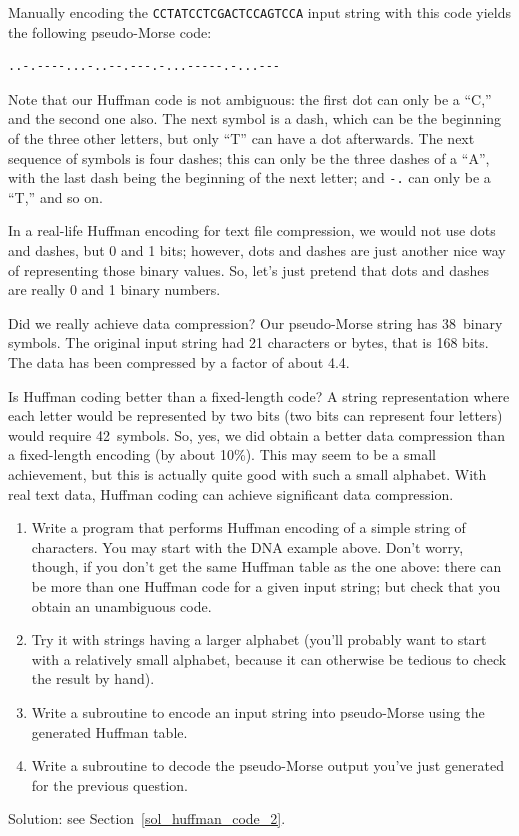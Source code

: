 Manually encoding the \verb'CCTATCCTCGACTCCAGTCCA' input string 
with this code yields the following pseudo-Morse code:

\begin{verbatim}
..-.----...-..--.---.-...-----.-...---
\end{verbatim}

Note that our Huffman code is not ambiguous: the first dot can 
only be a ``C,'' and the second one also. The next symbol is a 
dash, which can be the beginning of the three other letters, but 
only ``T'' can have a dot afterwards. The next sequence of 
symbols is four dashes; this can only be the three dashes of a 
``A'', with the last dash being the beginning of the next letter; 
and \verb'-.' can only be a ``T,'' and so on.

In a real-life Huffman encoding for text file compression, 
we would not use dots and dashes, but 0 and 1 bits; however,  
dots and dashes are just another nice way of representing 
those binary values. So, let's just pretend that dots and dashes 
are really 0 and 1 binary numbers.

Did we really achieve data compression? Our pseudo-Morse string has 
38~binary symbols. The original input string had 21 characters 
or bytes, that is 168 bits. The data has been compressed by a 
factor of about 4.4. 

Is Huffman coding better than a fixed-length code? A string 
representation where each letter would be represented by two 
bits (two bits can represent four letters) would require 
42~symbols. So, yes, we did obtain a better data compression 
than a fixed-length encoding (by about 10\%). This may seem 
to be a small achievement, but this is actually quite good with 
such a small alphabet. With real text data, Huffman coding can 
achieve significant data compression.


\begin{exercise}
\label{huffman_code_2}
\begin{enumerate}
\item Write a program that performs Huffman encoding of a simple string 
of characters. You may start with the DNA example above. Don't 
worry, though, if you don't get the same Huffman table as the one 
above: there can be more than one Huffman code for a given input 
string; but check that you obtain an unambiguous code. 
\item Try it with strings having a larger alphabet (you'll probably 
want to start with a relatively small alphabet, because it can 
otherwise be tedious to check the result by hand).
\item Write a subroutine to encode an input string into 
pseudo-Morse using the generated Huffman table.
\item Write a subroutine to decode the pseudo-Morse output 
you've just generated for the previous question.
\end{enumerate}
%
Solution: see Section~\ref{sol_huffman_code_2}.
\end{exercise}

